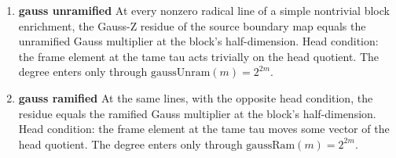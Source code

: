 \begin{enumerate}
\item[(1)] \textbf{gauss unramified} At every nonzero radical line of a simple nontrivial block enrichment, the Gauss-Z residue of the source boundary map equals the unramified Gauss multiplier at the block's half-dimension. Head condition: the frame element at the tame tau acts trivially on the head quotient. The degree enters only through $\mathrm{gaussUnram}(m)=2^{2m}$.
\item[(2)] \textbf{gauss ramified} At the same lines, with the opposite head condition, the residue equals the ramified Gauss multiplier at the block's half-dimension. Head condition: the frame element at the tame tau moves some vector of the head quotient. The degree enters only through $\mathrm{gaussRam}(m)=2^{2m}$.
\end{enumerate}
